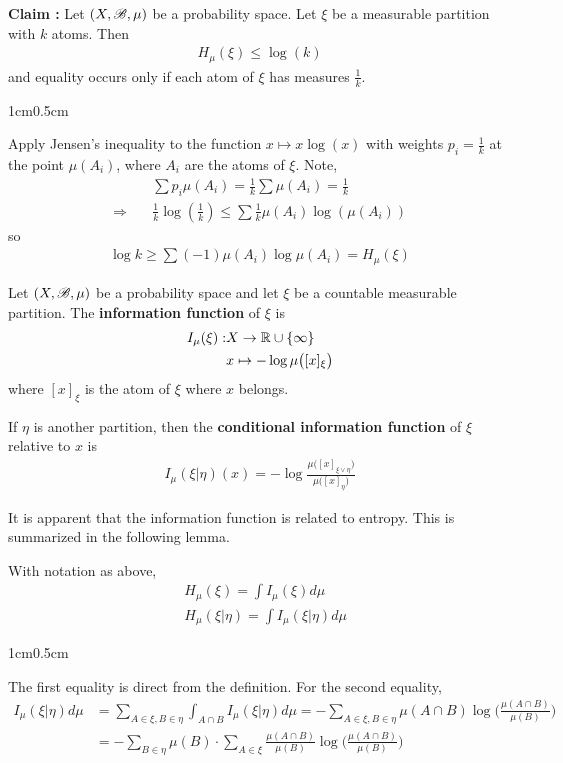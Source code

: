 \documentclass[12pt,a4paper]{report}
\newenvironment{proof}
{\begin{changemargin}{1cm}{0.5cm} 
	}%
	{\end{changemargin}
}
\begin{document}
\textbf{Claim :} Let $(X,\mathscr{B}, \mu)$ be a probability space. Let $\xi$ be a measurable partition with $k$ atoms. Then
\begin{align*}
H_{\mu}(\xi) \leq \log (k)
\end{align*}
and equality occurs only if each atom of $\xi$ has measures $\frac{1}{k}$.
\begin{proof}
\pf Apply Jensen's inequality to the function $x\mapsto x \log (x)$ with weights $p_i = \frac{1}{k}$ at the point $\mu(A_i)$, where $A_i$ are the atoms of $\xi$. Note,
\begin{align*}
& \sum p_i \mu(A_i) = \frac{1}{k} \sum \mu(A_i) = \frac{1}{k} \\
\Rightarrow \quad & \frac{1}{k} \log (\frac{1}{k}) \leq \sum \frac{1}{k} \mu(A_i) \log (\mu(A_i))
\end{align*}
so
\begin{align*}
\log k \geq \sum (-1) \mu(A_i) \log \mu(A_i) = H_{\mu}(\xi)
\end{align*}

\eop
\end{proof}

\s

 Let $(X, \mathscr{B}, \mu)$ be a probability space and let $\xi$ be a countable measurable partition. The \textbf{information function} of $\xi$ is
\begin{align*}
I_{\mu} (\xi) : & X \rightarrow \mathbb{R} \cup \{\infty \} \\
& x\mapsto -\log \mu \big( [x]_{\xi} \big)
\end{align*}
where $[x]_{\xi}$ is the atom of $\xi$ where $x$ belongs.

\quad If $\eta$ is another partition, then the \textbf{conditional information function} of $\xi$ relative to $x$ is
\begin{align*}
I_{\mu} (\xi | \eta) (x)  = - \log \frac{\mu \big( [x]_{\xi \vee \eta} \big)}{\mu \big( [x]_{\eta} \big)}
\end{align*}
\s

It is apparent that the information function is related to entropy. This is summarized in the following lemma.
\s

\lem With notation as above,
\begin{align*}
& H_{\mu}(\xi) = \int I_{\mu} (\xi) d \mu \\
& H_{\mu}(\xi | \eta) = \int I_{\mu} (\xi | \eta) d \mu
\end{align*}
\begin{proof}
\pf The first equality is direct from the definition. For the second equality,
\begin{align*}
I_{\mu} (\xi |\eta) d\mu &= \sum_{A\in \xi, B \in \eta} \int_{A \cap B} I_{\mu}(\xi | \eta) d\mu = - \sum_{A \in \xi, B\in \eta} \mu(A\cap B) \log \Big( \frac{\mu(A \cap B)}{\mu(B)}\Big) \\
&= -\sum_{B\in \eta} \mu(B) \cdot \sum_{A\in \xi} \frac{\mu(A\cap B)}{\mu(B)} \log \Big( \frac{\mu(A\cap B)}{\mu(B)} \Big)
\end{align*}

\eop
\end{proof}
\s
\end{document}
